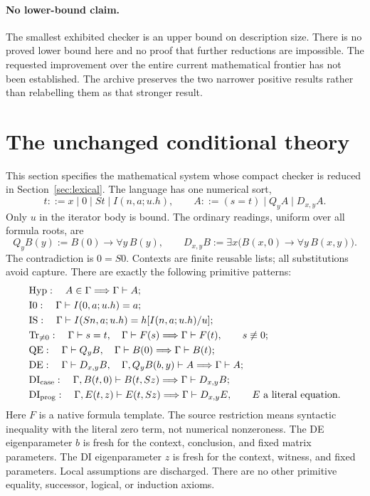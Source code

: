 \documentclass[11pt,a4paper]{article}
\theoremstyle{definition}\newtheorem{definition}[theorem]{Definition}
\begin{document}
\paragraph{No lower-bound claim.}
The smallest exhibited checker is an upper bound on description size.
There is no proved lower bound here and no proof that further reductions
are impossible. The requested improvement over the entire current
mathematical frontier has not been established. The archive preserves
the two narrower positive results rather than relabelling them as that
stronger result.

\section{The unchanged conditional theory}
\label{sec:conditional}

This section specifies the mathematical system whose compact checker is
reduced in Section~\ref{sec:lexical}. The language has one numerical sort,
\[
 t::=x\mid0\mid St\mid I(n,a;u.h),\qquad
 A::=(s=t)\mid Q_y A\mid D_{x,y}A.
\]
Only $u$ in the iterator body is bound. The ordinary readings, uniform
over all formula roots, are
\[
 Q_yB(y):=B(0)\to\forall y\,B(y),\qquad
 D_{x,y}B:=\exists x\bigl(B(x,0)\to\forall y\,B(x,y)\bigr).
\]
The contradiction is $0=S0$. Contexts are finite reusable lists; all
substitutions avoid capture. There are exactly the following primitive
patterns:
\begin{align*}
 &\mathrm{Hyp}:\quad A\in\Gamma\Longrightarrow\Gamma\vdash A;\\
 &\mathrm{I0}:\quad \Gamma\vdash I(0,a;u.h)=a;\\
 &\mathrm{IS}:\quad \Gamma\vdash I(Sn,a;u.h)=h[I(n,a;u.h)/u];\\
 &\mathrm{Tr}_{\ne0}:\quad
   \Gamma\vdash s=t,\quad\Gamma\vdash F(s)
   \Longrightarrow\Gamma\vdash F(t),\qquad s\not\equiv0;\\
 &\mathrm{QE}:\quad
   \Gamma\vdash Q_yB,\quad\Gamma\vdash B(0)
   \Longrightarrow\Gamma\vdash B(t);\\
 &\mathrm{DE}:\quad
   \Gamma\vdash D_{x,y}B,\quad\Gamma,Q_yB(b,y)\vdash A
   \Longrightarrow\Gamma\vdash A;\\
 &\mathrm{DI}_{\rm case}:\quad
   \Gamma,B(t,0)\vdash B(t,Sz)
   \Longrightarrow\Gamma\vdash D_{x,y}B;\\
 &\mathrm{DI}_{\rm prog}:\quad
   \Gamma,E(t,z)\vdash E(t,Sz)
   \Longrightarrow\Gamma\vdash D_{x,y}E,
   \qquad E\text{ a literal equation}.
\end{align*}
Here $F$ is a native formula template. The source restriction means
syntactic inequality with the literal zero term, not numerical
nonzeroness. The DE eigenparameter $b$ is fresh for the context,
conclusion, and fixed matrix parameters. The DI eigenparameter $z$ is
fresh for the context, witness, and fixed parameters. Local assumptions
are discharged. There are no other primitive equality, successor,
logical, or induction axioms.
\end{document}
